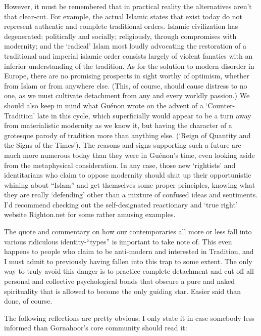\begin{footnotesize}
\begin{sffamily}
However, it must be remembered that in practical reality the alternatives aren't that clear-cut. For example, the actual Islamic states that exist today do not represent authentic and complete traditional orders. Islamic civilization has degenerated: politically and socially; religiously, through compromises with modernity; and the `radical' Islam most loudly advocating the restoration of a traditional and imperial islamic order consists largely of violent fanatics with an inferior understanding of the tradition. As for the solution to modern disorder in Europe, there are no promising prospects in sight worthy of optimism, whether from Islam or from anywhere else. (This, of course, should cause distress to no one, as we must cultivate detachment from any and every worldly passion.) We should also keep in mind what Guénon wrote on the advent of a `Counter-Tradition' late in this cycle, which superficially would appear to be a turn away from materialistic modernity as we know it, but having the character of a grotesque parody of tradition more than anything else. (`Reign of Quantity and the Signs of the Times'). The reasons and signs supporting such a future are much more numerous today than they were in Guénon's time, even looking aside from the metaphysical consideration. In any case, those new `rightists' and identitarians who claim to oppose modernity should shut up their opportunistic whining about ``Islam'' and get themselves some proper principles, knowing what they are really `defending' other than a mixture of confused ideas and sentiments. I'd recommend checking out the self-designated reactionary and `true right' website Righton.net for some rather amusing examples.

The quote and commentary on how our contemporaries all more or less fall into various ridiculous identity-``types'' is important to take note of. This even happens to people who claim to be anti-modern and interested in Tradition, and I must admit to previously having fallen into this trap to some extent. The only way to truly avoid this danger is to practice complete detachment and cut off all personal and collective psychological bonds that obscure a pure and naked spirituality that is allowed to become the only guiding star. Easier said than done, of course.

The following reflections are pretty obvious; I only state it in case somebody less informed than Gornahoor's core community should read it:


\end{sffamily}
\end{footnotesize}
